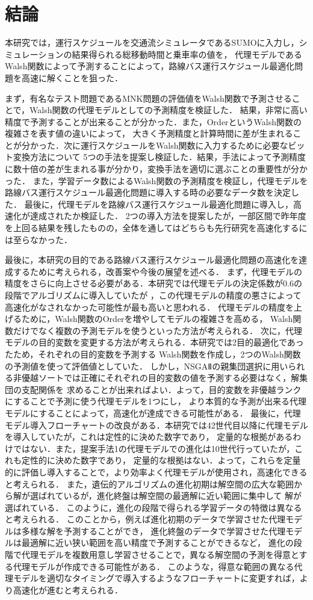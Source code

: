 \documentclass[main]{subfiles}
\begin{document}
\chapter{結論}
本研究では，運行スケジュールを交通流シミュレータであるSUMOに入力し，シミュレーションの結果得られる総移動時間と乗車率の値を，
代理モデルであるWalsh関数によって予測することによって，路線バス運行スケジュール最適化問題を高速に解くことを狙った．

まず，有名なテスト問題であるMNK問題の評価値をWalsh関数で予測させることで，Walsh関数の代理モデルとしての予測精度を検証した．
結果，非常に高い精度で予測することが出来ることが分かった．また，OrderというWalsh関数の複雑さを表す値の違いによって，
大きく予測精度と計算時間に差が生まれることが分かった．次に運行スケジュールをWalsh関数に入力するために必要なビット変換方法について
5つの手法を提案し検証した．結果，手法によって予測精度に数十倍の差が生まれる事が分かり，変換手法を適切に選ぶことの重要性が分かった．
また，学習データ数によるWalsh関数の予測精度を検証し，代理モデルを路線バス運行スケジュール最適化問題に導入する時の必要なデータ数を決定した．
最後に，代理モデルを路線バス運行スケジュール最適化問題に導入し，高速化が達成されたか検証した．
2つの導入方法を提案したが，一部区間で昨年度を上回る結果を残したものの，全体を通してはどちらも先行研究を高速化するには至らなかった．

最後に，本研究の目的である路線バス運行スケジュール最適化問題の高速化を達成するために考えられる，改善案や今後の展望を述べる．
まず，代理モデルの精度をさらに向上させる必要がある．本研究では代理モデルの決定係数が0.6の段階でアルゴリズムに導入していたが
，この代理モデルの精度の悪さによって高速化がなされなかった可能性が最も高いと思われる．
代理モデルの精度を上げるために，Walsh関数のOrderを増やしてモデルの複雑さを高める，
Walsh関数だけでなく複数の予測モデルを使うといった方法が考えられる．
次に，代理モデルの目的変数を変更する方法が考えられる．本研究では2目的最適化であったため，それぞれの目的変数を予測する
Walsh関数を作成し，2つのWalsh関数の予測値を使って評価値としていた．
しかし，NSGAⅡの親集団選択に用いられる非優越ソートでは正確にそれぞれの目的変数の値を予測する必要はなく，解集団の支配関係を
求めることが出来ればよい．よって，目的変数を非優越ランクにすることで予測に使う代理モデルを1つにし，
より本質的な予測が出来る代理モデルにすることによって，高速化が達成できる可能性がある．
最後に，代理モデル導入フローチャートの改良がある．本研究では42世代目以降に代理モデルを導入していたが，これは定性的に決めた数字であり，
定量的な根拠があるわけではない．また，提案手法1の代理モデルでの進化は10世代行っていたが，これも定性的に決めた数字であり，
定量的な根拠はない．よって，これらを定量的に評価し導入することで，より効率よく代理モデルが使用され，高速化できると考えられる．
また，遺伝的アルゴリズムの進化初期は解空間の広大な範囲から解が選ばれているが，進化終盤は解空間の最適解に近い範囲に集中して
解が選ばれている．
このように，進化の段階で得られる学習データの特徴は異なると考えられる．
このことから，例えば進化初期のデータで学習させた代理モデルは多様な解を予測することができ，
進化終盤のデータで学習させた代理モデルは最適解に近い狭い範囲を高い精度で予測することができるなど，
進化の段階で代理モデルを複数用意し学習させることで，異なる解空間の予測を得意とする代理モデルが作成できる可能性がある．
このような，得意な範囲の異なる代理モデルを適切なタイミングで導入するようなフローチャートに変更すれば，より高速化が進むと考えられる．
\end{document}
